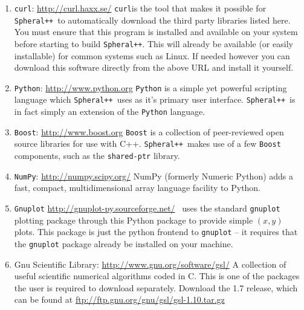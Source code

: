 \documentclass{article}
\newcommand{\Spheral}{{\tt Spheral++}}
\newcommand{\curl}{{\tt curl}}
\begin{document}
\begin{enumerate}
\item \curl: \url{http://curl.haxx.se/}
\curl is the tool that makes it possible for \Spheral\ to automatically download
the third party libraries listed here.  You must ensure that this program is
installed and available on your system before starting to build \Spheral.  This
will already be available (or easily installable) for common systems such as
Linux.  If needed however you can download this software directly from the
above URL and install it yourself.

\item \verb+Python+: \url{http://www.python.org} \label{python.item} \newline
\verb+Python+ is a simple yet powerful scripting language which \Spheral\ uses
as it's primary user interface.  \Spheral\ is in fact simply an extension of the
\verb+Python+ language.

\item \verb+Boost+: \url{http://www.boost.org} \label{boost.item} \newline
\verb+Boost+ is a collection of peer-reviewed open source libraries for use with
C++.  \Spheral\ makes use of a few \verb+Boost+ components, such as the
\verb+shared-ptr+ library.

\item \verb+NumPy+: \url{http://numpy.scipy.org/} \newline
NumPy (formerly Numeric Python) adds a fast, compact, multidimensional array
language facility to Python.

\item \verb+Gnuplot+ \label{gnuplot.item}
  \url{http://gnuplot-py.sourceforge.net/} \newline \Spheral\ uses the standard
  \verb+gnuplot+ plotting package through this Python package to provide simple
  $(x,y)$ plots.  This package is just the python frontend to \verb+gnuplot+ --
  it requires that the \verb+gnuplot+ package already be installed on your
  machine.

\item Gnu Scientific Library:
  \url{http://www.gnu.org/software/gsl/} \label{gsl.item} \newline A collection
  of useful scientific numerical algorithms coded in C.  This is one of the
  packages the user is required to download separately.  Download the 1.7
  release, which can be found at \newline
  \url{ftp://ftp.gnu.org/gnu/gsl/gsl-1.10.tar.gz}


\end{enumerate}
\end{document}
